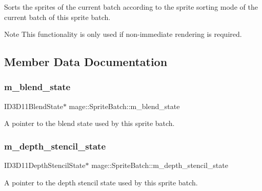 Sorts the sprites of the current batch according to the sprite sorting mode of the current batch of this sprite batch.

\begin{DoxyNote}{Note}
This functionality is only used if non-\/immediate rendering is required. 
\end{DoxyNote}


\subsection{Member Data Documentation}
\hypertarget{classmage_1_1_sprite_batch_a8b568bfe7eb54c6ccad2fe635678aa1f}{}\label{classmage_1_1_sprite_batch_a8b568bfe7eb54c6ccad2fe635678aa1f} 
\subsubsection{\texorpdfstring{m\+\_\+blend\+\_\+state}{m\_blend\_state}}
{\footnotesize\ttfamily I\+D3\+D11\+Blend\+State$\ast$ mage\+::\+Sprite\+Batch\+::m\+\_\+blend\+\_\+state\hspace{0.3cm}{\ttfamily [private]}}

A pointer to the blend state used by this sprite batch. \hypertarget{classmage_1_1_sprite_batch_a120d8d18acfd5c113ffb3e537ef21f41}{}\label{classmage_1_1_sprite_batch_a120d8d18acfd5c113ffb3e537ef21f41} 
\subsubsection{\texorpdfstring{m\+\_\+depth\+\_\+stencil\+\_\+state}{m\_depth\_stencil\_state}}
{\footnotesize\ttfamily I\+D3\+D11\+Depth\+Stencil\+State$\ast$ mage\+::\+Sprite\+Batch\+::m\+\_\+depth\+\_\+stencil\+\_\+state\hspace{0.3cm}{\ttfamily [private]}}

A pointer to the depth stencil state used by this sprite batch. \hypertarget{classmage_1_1_sprite_batch_a95d4de79a01ffe5603a2cfa2eddd53b7}{}\label{classmage_1_1_sprite_batch_a95d4de79a01ffe5603a2cfa2eddd53b7} 

